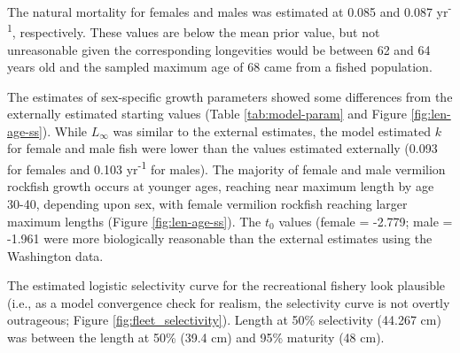 \documentclass[11pt,
  english,
  a4paper,
]{article}
\begin{document}
\leavevmode\tagmcend\tagstructend\par


The natural mortality for females and males was estimated at 0.085 and 0.087 yr\textsuperscript{-1}, respectively. These values are below the mean prior value, but not unreasonable given the corresponding longevities would be between 62 and 64 years old and the sampled maximum age of 68 came from a fished population.

\leavevmode\tagmcend\tagstructend\par


The estimates of sex-specific growth parameters showed some differences from the externally estimated starting values (Table \ref{tab:model-param} and Figure \ref{fig:len-age-ss}). While {\(L_{\infty}\)\leavevmode\tagmcend\tagstructend} was similar to the external estimates, the model estimated {\(k\)\leavevmode\tagmcend\tagstructend} for female and male fish were lower than the values estimated externally (0.093 for females and 0.103 yr\textsuperscript{-1} for males). The majority of female and male vermilion rockfish growth occurs at younger ages, reaching near maximum length by age 30-40, depending upon sex, with female vermilion rockfish reaching larger maximum lengths (Figure \ref{fig:len-age-ss}). The {\(t_0\)\leavevmode\tagmcend\tagstructend} values (female = -2.779; male = -1.961 were more biologically reasonable than the external estimates using the Washington data.

\leavevmode\tagmcend\tagstructend\par


The estimated logistic selectivity curve for the recreational fishery look plausible (i.e., as a model convergence check for realism, the selectivity curve is not overtly outrageous; Figure \ref{fig:fleet_selectivity}). Length at 50\% selectivity (44.267 cm) was between the length at 50\% (39.4 cm) and 95\% maturity (48 cm).

\leavevmode\tagmcend\tagstructend\par

\end{document}
